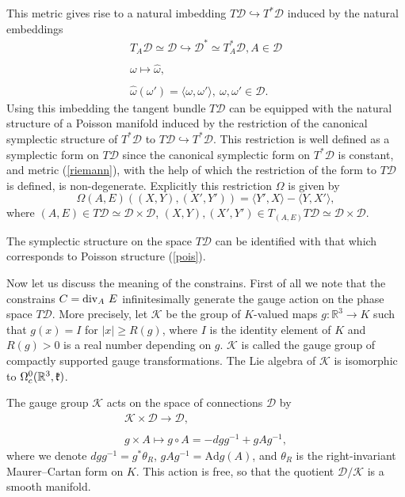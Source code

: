 \documentclass{amsart}
\begin{document}
This metric gives rise to a natural imbedding $T\mathcal{D}\hookrightarrow
T^*\mathcal{D}$ induced by the natural embeddings
$$
\begin{array}{l}
T_A\mathcal{D}\simeq \mathcal{D}\hookrightarrow \mathcal{D}^*\simeq T_A^*\mathcal{D}, A\in\mathcal{D} \\
\\
\omega \mapsto \hat{\omega},\\
\\
\hat{\omega}(\omega')=\langle \omega,\omega'\rangle ,~\omega,\omega'\in \mathcal{D}.
\end{array}
$$
Using this imbedding the tangent bundle $T\mathcal{D}$ can be
equipped with the natural structure of a Poisson manifold induced by the restriction of
the canonical symplectic structure of $T^*\mathcal{D}$ to $T\mathcal{D}\hookrightarrow
T^*\mathcal{D}$. This restriction is well defined as a symplectic form on $T\mathcal{D}$ since the canonical symplectic form on $T^*\mathcal{D}$ is constant, and metric (\ref{riemann}), with the help of which the restriction of the form to $T\mathcal{D}$ is defined, is non-degenerate. Explicitly this restriction $\Omega$ is given by 
$$
\Omega(A,E)((X,Y),(X',Y'))=\langle Y',X\rangle-\langle Y,X'\rangle,
$$
where $(A,E)\in T\mathcal{D}\simeq \mathcal{D}\times \mathcal{D}$, $(X,Y),(X',Y')\in T_{(A,E)}T\mathcal{D}\simeq \mathcal{D}\times \mathcal{D}$.

The symplectic structure on the space $T\mathcal{D}$ can be identified with that which corresponds to Poisson structure (\ref{pois}).

Now let us discuss the meaning of the constrains. First of all we note that
the constrains $C={\rm div}_A~E$ infinitesimally generate the gauge action on
the phase space $T\mathcal{D}$. More precisely, let $\mathcal{K}$ be the group
of $K$-valued maps $g:\mathbb{R}^{3}\rightarrow K$ such that $g(x)=I$ for
$|x|\geq R(g)$, where $I$ is the identity element of $K$ and $R(g)>0$ is a
real number depending on $g$. $\mathcal{K}$ is called the gauge group of
compactly supported gauge transformations. The Lie algebra of $\mathcal{K}$
is isomorphic to $\Omega^0_c(\mathbb{R}^{3},\mathfrak k)$.

The gauge group $\mathcal{K}$ acts on the space of connections $\mathcal{D}$
by
\begin{equation}\label{Gaugeact}
\begin{array}{l}
\mathcal{K}\times \mathcal{D} \rightarrow \mathcal{D},\\
\\
g\times A \mapsto g\circ A= -dgg^{-1}+gAg^{-1},
\end{array}
\end{equation}
where we denote $dgg^{-1}=g^*\theta_R$, $gAg^{-1}=\mathrm{Ad}g(A)$, and
$\theta_R$ is the right-invariant Maurer--Cartan form on $K$. This action is free,
so that the quotient $\mathcal{D}/\mathcal{K}$ is a smooth
manifold.
\end{document}
